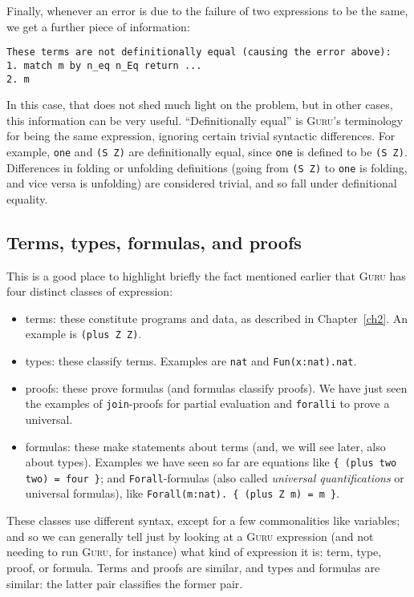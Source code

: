 \documentclass{book}[12pt]
\newcommand{\guru}[0]{\textsc{Guru}\xspace}
\begin{document}
Finally, whenever an error is due to the failure of two expressions to be
the same, we get a further piece of information:

\begin{verbatim}
These terms are not definitionally equal (causing the error above):
1. match m by n_eq n_Eq return ...
2. m
\end{verbatim}

\noindent In this case, that does not shed much light on the problem,
but in other cases, this information can be very useful.
``Definitionally equal'' is \guru's terminology for being the same
expression, ignoring certain trivial syntactic differences.  For
example, \texttt{one} and \texttt{(S Z)} are definitionally equal,
since \texttt{one} is defined to be \texttt{(S Z)}.  Differences in
folding or unfolding definitions (going from \texttt{(S Z)} to
\texttt{one} is folding, and vice versa is unfolding) are considered
trivial, and so fall under definitional equality.

\subsection{Terms, types, formulas, and proofs}

This is a good place to highlight briefly the fact mentioned earlier
that \guru has four distinct classes of expression:

\begin{itemize}
\item terms: these constitute programs and data, as described in Chapter~\ref{ch2}.  An example is \texttt{(plus Z Z)}.
\item types: these classify terms.  Examples are \texttt{nat} and \texttt{Fun(x:nat).nat}.
\item proofs: these prove formulas (and formulas classify proofs).  We
have just seen the examples of \texttt{join}-proofs for partial
evaluation and \texttt{foralli} to prove a universal.
\item formulas: these make statements about terms (and, we will see
later, also about types).  Examples we have seen so far are equations
like \texttt{\{ (plus two two) = four \}}; and
\texttt{Forall}-formulas (also called \emph{universal quantifications}
or universal formulas), like \texttt{Forall(m:nat). \{ (plus Z m) = m
\}}.
\end{itemize}

These classes use different syntax, except for a few commonalities
like variables; and so we can generally tell just by looking at a
\guru expression (and not needing to run \guru, for instance) what
kind of expression it is: term, type, proof, or formula.  Terms and
proofs are similar, and types and formulas are similar: the latter
pair classifies the former pair.
\end{document}
